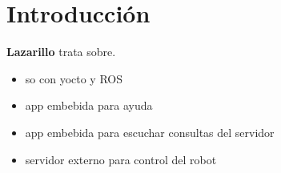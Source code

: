\chapter{Introducción}

\textbf{Lazarillo} trata sobre.

\begin{itemize}
	\item so con yocto y ROS
	\item app embebida para ayuda
	\item app embebida para escuchar consultas del servidor
	\item servidor externo para control del robot
\end{itemize}

